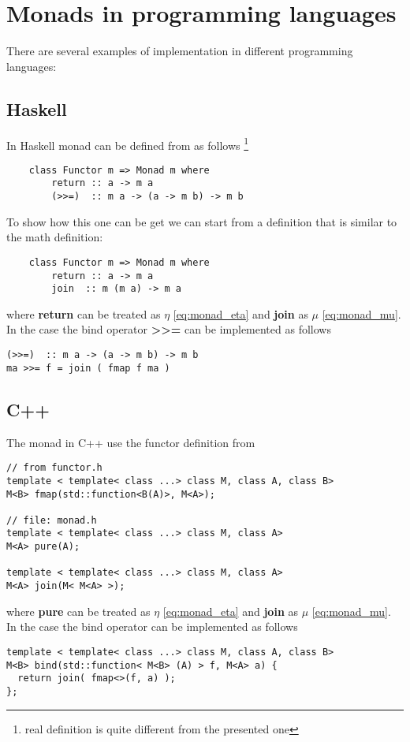\section{Monads in programming languages}
There are several examples of  implementation in
different programming languages:

\subsection{Haskell}

\begin{example}
\label{ex:monad_haskell}
In Haskell monad can be defined from  as follows 
\footnote{real definition is quite different from the presented one}
\begin{verbatim}
    class Functor m => Monad m where
        return :: a -> m a
        (>>=)  :: m a -> (a -> m b) -> m b
\end{verbatim} 

To show how this one can be get we can start from a definition that is
similar to the math definition:
\begin{verbatim}
    class Functor m => Monad m where
        return :: a -> m a
        join  :: m (m a) -> m a
\end{verbatim} 
where \textbf{return} can be treated as $\eta$
\eqref{eq:monad_eta} and 
\textbf{join} as $\mu$ \eqref{eq:monad_mu}. In the case
the bind operator \textbf{>>=} can be implemented as follows
\begin{verbatim}
(>>=)  :: m a -> (a -> m b) -> m b
ma >>= f = join ( fmap f ma )
\end{verbatim} 

\end{example}

\subsection{C++}
The monad in C++ use the functor definition from 
\begin{verbatim}
// from functor.h
template < template< class ...> class M, class A, class B> 
M<B> fmap(std::function<B(A)>, M<A>);

// file: monad.h
template < template< class ...> class M, class A> 
M<A> pure(A);

template < template< class ...> class M, class A> 
M<A> join(M< M<A> >);
\end{verbatim}
where \textbf{pure} can be treated as $\eta$
\eqref{eq:monad_eta} and 
\textbf{join} as $\mu$ \eqref{eq:monad_mu}. In the case
the bind operator can be implemented as follows
\begin{verbatim}
template < template< class ...> class M, class A, class B> 
M<B> bind(std::function< M<B> (A) > f, M<A> a) {
  return join( fmap<>(f, a) );
};
\end{verbatim}

